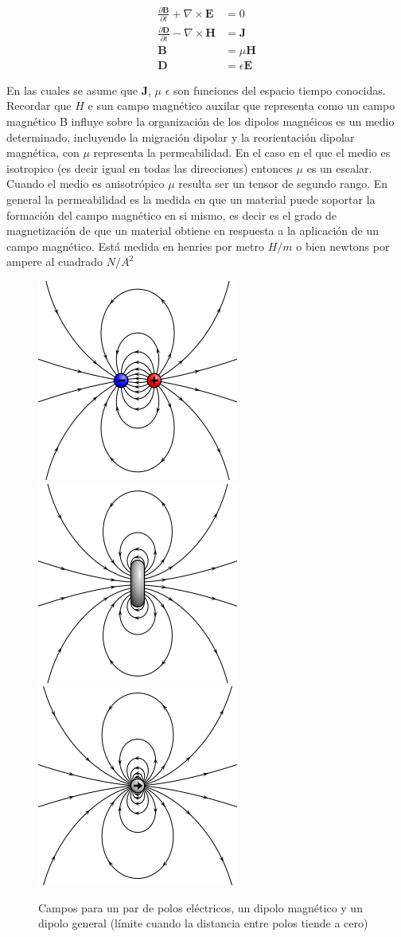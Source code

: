 \documentclass[]{article}
\begin{document}
\begin{eqnarray}
\frac{\partial \mathbf{B}}{\partial t} + \nabla \times \mathbf{E} &=0  \\
\frac{\partial \mathbf{D}}{\partial t} - \nabla \times \mathbf{H} &=\mathbf{J}  \\
\mathbf{B} &= \mu \mathbf{H} \\
\mathbf{D} &= \epsilon \mathbf{E} 
\end{eqnarray}

En las cuales se asume que \(\mathbf{J}\), \(\mu\) \(\epsilon\) son
funciones del espacio tiempo conocidas. Recordar que \(H\) e sun campo
magnético auxilar que representa como un campo magnético B influye sobre
la organización de los dipolos magnéicos es un medio determinado,
incluyendo la migración dipolar y la reorientación dipolar magnética,
con \(\mu\) representa la permeabilidad. En el caso en el que el medio
es isotropico (es decir igual en todas las direcciones) entonces \(\mu\)
es un escalar. Cuando el medio es anisotrópico \(\mu\) resulta ser un
tensor de segundo rango. En general la permeabilidad es la medida en que
un material puede soportar la formación del campo magnético en si mismo,
es decir es el grado de magnetización de que un material obtiene en
respuesta a la aplicación de un campo magnético. Está medida en henries
por metro \(H/m\) o bien newtons por ampere al cuadrado \(N/A^2\)

\begin{figure}[htp]
\centering
\includegraphics[width=.3\textwidth]{img/dipole_electric.svg.png}
\includegraphics[width=.3\textwidth]{img/dipole_magnetic.svg.png}
\includegraphics[width=.3\textwidth]{img/dipole_point.svg.png}
\caption{Campos para un par de polos eléctricos, un dipolo magnético y un dipolo general (límite cuando la distancia entre polos tiende a cero)}
\end{figure}
\end{document}
